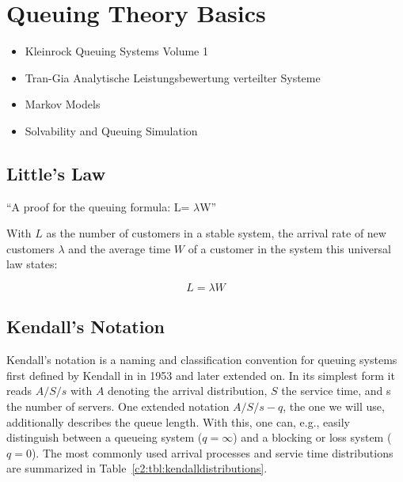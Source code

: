 \section{Queuing Theory Basics}




\begin{itemize}
\item Kleinrock Queuing Systems Volume 1 \cite{Kleinrock:1975:TVQ:1096491}
\item Tran-Gia Analytische Leistungsbewertung verteilter Systeme \cite{trangia-lbvs}
\item Markov Models 
\item Solvability and Queuing Simulation
\end{itemize}


\subsection{Little's Law}
``A proof for the queuing formula: L= $\lambda$W'' \cite{little1961proof}

With $L$  as the number of customers in a stable system, the arrival rate of new customers $\lambda$ and the average time $W$ of a customer in the system this universal law states:

\begin{equation}
L = \lambda W
\end{equation}

\subsection{Kendall's Notation}

Kendall's notation is a naming and classification convention for queuing systems first defined by Kendall in in 1953 \cite{kendall1953stochastic} and later extended on. In its simplest form it reads $A/S/s$ with $A$ denoting the arrival distribution, $S$ the service time, and s the number of servers. One extended notation $A/S/s-q$, the one we will use, additionally describes the queue length. With this, one can, e.g., easily distinguish between a queueing system ($q=\infty$) and a blocking or loss system ($q=0$). The most commonly used arrival processes and servie time distributions are summarized in Table~\ref{c2:tbl:kendalldistributions}.


